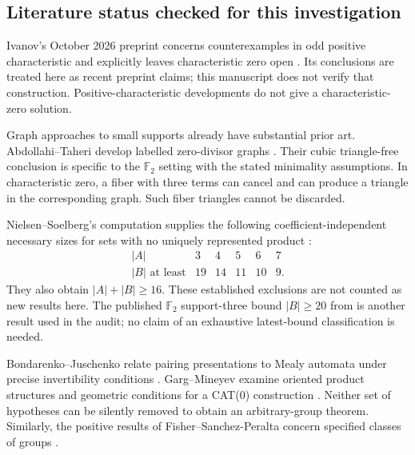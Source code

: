 \documentclass[11pt,a4paper,oneside]{report}
\theoremstyle{definition}
\theoremstyle{remark}
\begin{document}
\subsection{Literature status checked for this investigation}
Ivanov's October 2026 preprint concerns counterexamples in odd positive characteristic and explicitly leaves characteristic zero open \cite{B:Ivanov}. Its conclusions are treated here as recent preprint claims; this manuscript does not verify that construction. Positive-characteristic developments do not give a characteristic-zero solution.

Graph approaches to small supports already have substantial prior art. Abdollahi--Taheri develop labelled zero-divisor graphs \cite{B:ATsmall}. Their cubic triangle-free conclusion is specific to the \(\mathbb F_2\) setting with the stated minimality assumptions. In characteristic zero, a fiber with three terms can cancel and can produce a triangle in the corresponding graph. Such fiber triangles cannot be discarded.

Nielsen--Soelberg's computation supplies the following coefficient-independent necessary sizes for sets with no uniquely represented product \cite[Theorem 1.4]{B:NS}:
\[
\begin{array}{c|ccccc}
|A|&3&4&5&6&7\\ \hline
|B|\text{ at least}&19&14&11&10&9.
\end{array}
\]
They also obtain \(|A|+|B|\ge16\). These established exclusions are not counted as new results here. The published \(\mathbb F_2\) support-three bound \(|B|\ge20\) from \cite{B:ATsmall} is another result used in the audit; no claim of an exhaustive latest-bound classification is needed.

Bondarenko--Juschenko relate pairing presentations to Mealy automata under precise invertibility conditions \cite{B:BJ}. Garg--Mineyev examine oriented product structures and geometric conditions for a CAT(0) construction \cite{B:GM}. Neither set of hypotheses can be silently removed to obtain an arbitrary-group theorem. Similarly, the positive results of Fisher--Sanchez-Peralta concern specified classes of groups \cite{B:FSP}.
\end{document}
